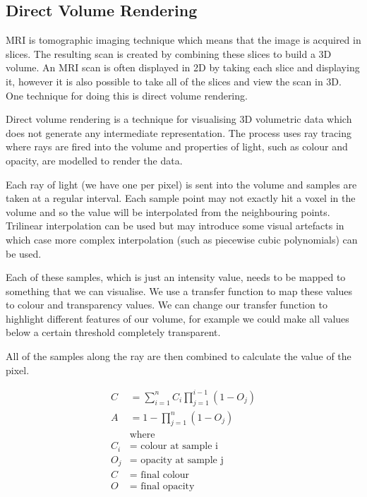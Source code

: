 \documentclass[
  oneside,
  11pt, a4paper,
  footinclude=true,
  headinclude=true,
  cleardoublepage=empty
]{scrbook}
\begin{document}
\subsection{Direct Volume Rendering\cite{nvidia:volumerendering}}
MRI is tomographic imaging technique which means that the image is acquired in slices. The resulting scan is created by combining these slices to build a 3D volume. An MRI scan is often displayed in 2D by taking each slice and displaying it, however it is also possible to take all of the slices and view the scan in 3D. One technique for doing this is direct volume rendering.

Direct volume rendering is a technique for visualising 3D volumetric data which does not generate any intermediate representation. The process uses ray tracing where rays are fired into the volume and properties of light, such as colour and opacity, are modelled to render the data.

Each ray of light (we have one per pixel) is sent into the volume and samples are taken at a regular interval. Each sample point may not exactly hit a voxel in the volume and so the value will be interpolated from the neighbouring points. Trilinear interpolation can be used but may introduce some visual artefacts in which case more complex interpolation (such as piecewise cubic polynomials) can be used.

Each of these samples, which is just an intensity value, needs to be mapped to something that we can visualise. We use a transfer function to map these values to colour and transparency values. We can change our transfer function to highlight different features of our volume, for example we could make all values below a certain threshold completely transparent.

All of the samples along the ray are then combined to calculate the value of the pixel.

\begin{align*}
	C &= \sum\limits_{i=1}^n C_{i}\prod\limits_{j=1}^{i-1}(1 - O_j) \\
	A &= 1 - \prod\limits_{j=1}^n(1 - O_j) \\
	& \text{where} \\
	C_i &= \text{ colour at sample i} \\
	O_j &= \text{ opacity at sample j} \\
	C &= \text{ final colour} \\
	O &= \text{ final opacity}
\end{align*}
\end{document}
